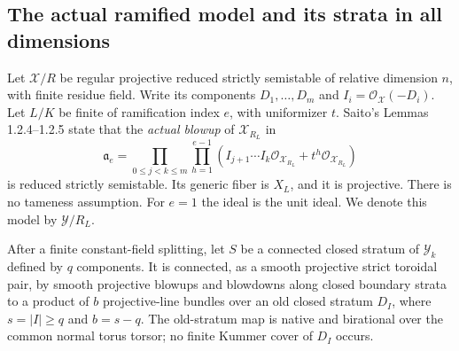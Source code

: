 \subsection{The actual ramified model and its strata in all dimensions}

Let $\mathcal X/R$ be regular projective reduced strictly
semistable of relative dimension $n$, with finite residue field.
Write its components $D_1,\ldots,D_m$ and
$I_i=\mathcal O_{\mathcal X}(-D_i)$.  Let $L/K$ be finite
of ramification index $e$, with uniformizer $t$.
Saito's Lemmas 1.2.4--1.2.5 state that the \emph{actual blowup}
of $\mathcal X_{R_L}$ in
\[
 \mathfrak a_e=
 \prod_{0\le j<k\le m}\prod_{h=1}^{e-1}
       (I_{j+1}\cdots I_k\mathcal O_{\mathcal X_{R_L}}
                                          +t^h\mathcal O_{\mathcal X_{R_L}})
 \tag{RT20.6}\label{r20rt:saito}
\]
is reduced strictly semistable.  Its generic fiber is $X_L$,
and it is projective.  There is no tameness assumption.
For $e=1$ the ideal is the unit ideal.  We denote this model
by $\mathcal Y/R_L$.

\begin{lemma}
\label{r20rt:comparison}
After a finite constant-field splitting, let $S$ be a connected
closed stratum of $\mathcal Y_k$ defined by $q$ components.
It is connected, as a smooth projective strict toroidal pair,
by smooth projective blowups and blowdowns along closed
boundary strata to a product of $b$ projective-line bundles
over an old closed stratum $D_I$, where
$s=|I|\geq q$ and $b=s-q$.
The old-stratum map is native and birational over the common
normal torus torsor; no finite Kummer cover of $D_I$ occurs.
\end{lemma}

